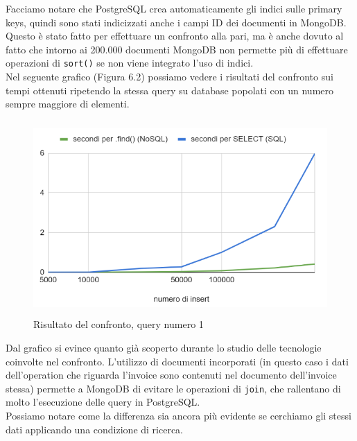 \noindent Facciamo notare che PostgreSQL crea automaticamente gli indici sulle primary keys, quindi sono stati indicizzati anche i campi ID dei documenti in MongoDB. Questo è stato fatto per effettuare un confronto alla pari, ma è anche dovuto al fatto che intorno ai 200.000 documenti MongoDB non permette più di effettuare operazioni di \texttt{sort()} se non viene integrato l'uso di indici.\\

\noindent Nel seguente grafico (Figura 6.2) possiamo vedere i risultati del confronto sui tempi ottenuti ripetendo la stessa query su database popolati con un numero sempre maggiore di elementi.\\

\begin{figure}[htbp]
\begin{center}
\includegraphics[height=20em]{immagini/query/query1_results.png}
\caption{Risultato del confronto, query numero 1}
\end{center}
\end{figure}

\noindent Dal grafico si evince quanto già scoperto durante lo studio delle tecnologie coinvolte nel confronto. L'utilizzo di documenti incorporati (in questo caso i dati dell'operation che riguarda l'invoice sono contenuti nel documento dell'invoice stessa) permette a MongoDB di evitare le operazioni di \texttt{join}, che rallentano di molto l'esecuzione delle query in PostgreSQL.\\

\noindent Possiamo notare come la differenza sia ancora più evidente se cerchiamo gli stessi dati applicando una condizione di ricerca.\\


